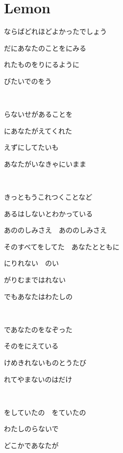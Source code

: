 \section{Lemon}

ならばどれほどよかったでしょう

だにあなたのことをにみる

れたものをりにるように

びたいでのをう

~

らないせがあることを

にあなたがえてくれた

えずにしてたいも

あなたがいなきゃにいまま

~

きっともうこれつくことなど

あるはしないとわかっている

あののしみさえ　あののしみさえ

そのすべてをしてた　あなたとともに

にりれない　のい

がりむまではれない

でもあなたはわたしの

~

であなたのをなぞった

そのをにえている

けめきれないものとうたび

れてやまないのはだけ

~

をしていたの　をていたの

わたしのらないで

どこかであなたが

